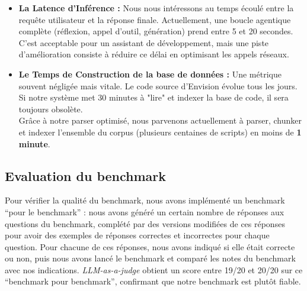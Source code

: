 \begin{itemize}
    \item \textbf{La Latence d'Inférence :} 
    Nous nous intéressons au temps écoulé entre la requête utilisateur et la réponse finale. Actuellement, une boucle agentique complète (réflexion, appel d'outil, génération) prend entre 5 et 20 secondes. C'est acceptable pour un assistant de développement, mais une piste d'amélioration consiste à réduire ce délai en optimisant les appels réseaux.
    
    \item \textbf{Le Temps de Construction de la base de données :} 
    Une métrique souvent négligée mais vitale. Le code source d'Envision évolue tous les jours. Si notre système met 30 minutes à "lire" et indexer la base de code, il sera toujours obsolète.
    \\ Grâce à notre parser optimisé, nous parvenons actuellement à parser, chunker et indexer l'ensemble du corpus (plusieurs centaines de scripts) en moins de \textbf{1 minute}.
\end{itemize}

\subsection{Evaluation du benchmark}

Pour vérifier la qualité du benchmark, nous avons implémenté un benchmark “pour le benchmark” : nous avons généré un certain nombre de réponses aux questions du benchmark, complété par des versions modifiées de ces réponses pour avoir des exemples de réponses correctes et incorrectes pour chaque question. Pour chacune de ces réponses, nous avons indiqué si elle était correcte ou non, puis nous avons lancé le benchmark et comparé les notes du benchmark avec nos indications. \textit{LLM-as-a-judge} obtient un score entre 19/20 et 20/20 sur ce “benchmark pour benchmark”, confirmant que notre benchmark est plutôt fiable.